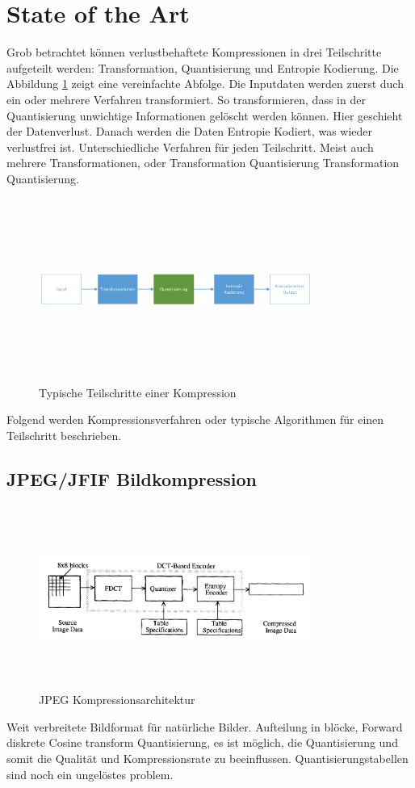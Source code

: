 \section{State of the Art}
Grob betrachtet können verlustbehaftete Kompressionen in drei Teilschritte aufgeteilt werden: Transformation, Quantisierung und Entropie Kodierung. Die Abbildung \ref{state:aufbau} zeigt eine vereinfachte Abfolge. Die Inputdaten werden zuerst duch ein oder mehrere Verfahren transformiert. So transformieren, dass in der Quantisierung unwichtige Informationen gelöscht werden können. Hier geschieht der Datenverlust. Danach werden die Daten Entropie Kodiert, was wieder verlustfrei ist. Unterschiedliche Verfahren für jeden Teilschritt. Meist auch mehrere Transformationen, oder Transformation Quantisierung Transformation Quantisierung.\\
\begin{figure}[!htbp]
	\center
	\includegraphics[width=0.8\textwidth,height=6cm,keepaspectratio]{./pictures/state/aufbau.png}
	\caption{Typische Teilschritte einer Kompression}
	\label{state:aufbau}
\end{figure}
Folgend werden Kompressionsverfahren oder typische Algorithmen für einen Teilschritt beschrieben.

\subsection{JPEG/JFIF Bildkompression}
\begin{figure}[!htbp]
	\center
	\includegraphics[width=0.8\textwidth,height=6cm,keepaspectratio]{./pictures/state/jpeg.png}
	\caption{JPEG Kompressionsarchitektur \cite{wallace1992jpeg}}
	\label{state:jpeg:abb}
\end{figure}
Weit verbreitete Bildformat für natürliche Bilder.
Aufteilung in blöcke, 
Forward diskrete Cosine transform
Quantisierung, es ist möglich, die Quantisierung und somit die Qualität und Kompressionsrate zu beeinflussen.
Quantisierungstabellen sind noch ein ungelöstes problem.\cite{wu1993rate:jpeg} \cite{wang2001designing:jpeg} 

